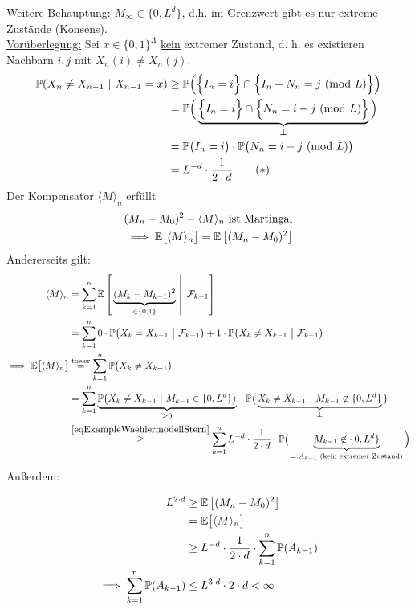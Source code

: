 \begin{beisp}[Wählermodell]
\ul{Weitere Behauptung:} $M_\infty\in\lbrace 0,L^d\rbrace$, d.h. im Grenzwert gibt es nur extreme Zustände (Konsens).\\

\ul{Vorüberlegung:} Sei $x\in\lbrace0,1\rbrace^{\Lambda}$ \ul{kein} extremer Zustand, d. h. es existieren Nachbarn $i,j$ mit $X_n(i)\neq X_n(j)$.
\begin{align}
\P(X_n\neq X_{n-1}~|~X_{n-1}=x)\nonumber
&\geq \P\Big(\Big\lbrace I_n=i\Big\rbrace \cap \Big\lbrace I_n+N_n=j~(\text{mod } L)\Big\rbrace\Big)\\
&=\P\Big(\underbrace{\Big\lbrace I_n=i\Big\rbrace \cap\Big\lbrace N_n=i-j~(\text{mod  }L)\Big\rbrace}_{\unab}\Big)\nonumber\\
&=\P\big(I_n=i\big)\cdot\P\big(N_n=i-j~(\text{mod  }L)\big)\nonumber\\
&=L^{-d}\cdot\frac{1}{2\cdot d}\label{eqExampleWaehlermodellStern}\tag{$\ast$}
\end{align}
Der Kompensator $\langle M\rangle_n$ erfüllt
\begin{align*}
(M_n-M_0)^2-\langle M\rangle_n\text{ ist Martingal}\\
\implies
\mathbb{E}\big[\langle M\rangle_n\big]=\mathbb{E}\left[(M_n-M_0)^2\right]
\end{align*}
Andererseits gilt:
\begin{align*}
\langle M\rangle_n 
&=\sum\limits_{k=1}^n\E\left[\left.\underbrace{(M_k-M_{k-1})^2}_{\in\lbrace0,1\rbrace}~\right|~\F_{k-1}\right]\\
&=\sum\limits_{k=1}^n0 \cdot \P\big(X_k= X_{k-1}~\big|~\F_{k-1}\big)+ 1 \cdot \P\big(X_k\neq X_{k-1}~\big|~\F_{k-1}\big)\\
\implies
\E\big[\langle M\rangle_n\big]
&\stackeq{\text{tower}}\sum\limits_{k=1}^n\P\big(X_k\neq X_{k-1}\big)\\
&=\sum\limits_{k=1}^n\underbrace{\P\big(X_k\neq X_{k-1}~|~ M_{k-1} \in \{0,L^d\}\big)}_{\geq 0} + \P\big(\underbrace{X_k\neq X_{k-1}~|~ M_{k-1} \not\in \{0,L^d\}}_{\unab}\big)\\
&\stackrel{\eqref{eqExampleWaehlermodellStern}}{\geq}
\sum\limits_{k=1}^n L^{-d}\cdot\frac{1}{2\cdot d}\cdot\P\big(\underbrace{M_{k-1}\not\in\lbrace0,L^d\rbrace}_{=:A_{k-1}\text{ (kein extremer Zustand)}}\Big)
\end{align*}
Außerdem:

\begin{align*}
L^{2\cdot d}
&\geq \mathbb{E}\left[(M_n-M_0)^2\right]\\
&=\mathbb{E}\big[\langle M\rangle_n\big]\\
&\geq L^{-d}\cdot\frac{1}{2\cdot d}\cdot\sum\limits_{k=1}^n\mathbb{P}(A_{k-1})\\
\implies
\sum\limits_{k=1}^n\mathbb{P}(A_{k-1})&\leq L^{3\cdot d}\cdot 2\cdot d<\infty
\end{align*}


\end{beisp}
